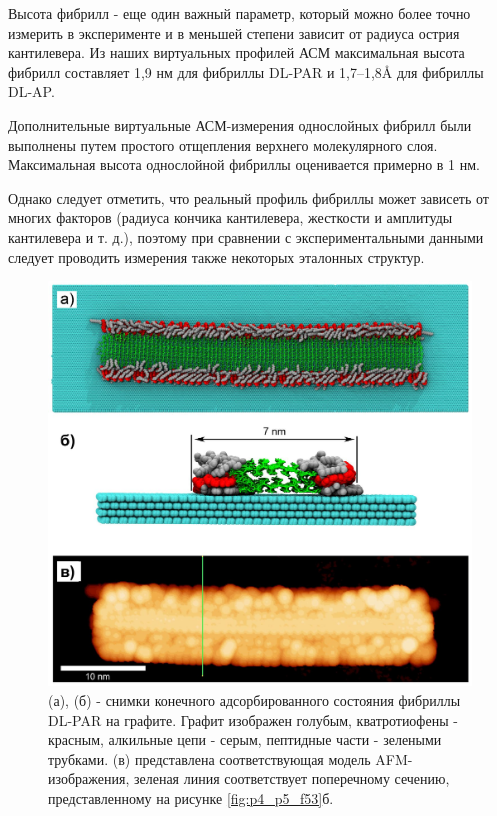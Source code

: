     Высота фибрилл - еще один важный параметр, который можно более точно измерить в эксперименте и в меньшей степени зависит от радиуса острия кантилевера. Из наших виртуальных профилей АСМ максимальная высота фибрилл составляет 1,9 нм для фибриллы DL-PAR и 1,7–1,8\AA{} для фибриллы DL-AP.

    Дополнительные виртуальные АСМ-измерения однослойных фибрилл были выполнены путем простого отщепления верхнего молекулярного слоя. Максимальная высота однослойной фибриллы оценивается примерно в 1 нм.

    Однако следует отметить, что реальный профиль фибриллы может зависеть от многих факторов (радиуса кончика кантилевера, жесткости и амплитуды кантилевера и т. д.), поэтому при сравнении с экспериментальными данными следует проводить измерения также некоторых эталонных структур.


\begin{figure} [H]
    \centering
    \includegraphics[width=\textwidth]{images/p4/punkt5/part4_p5_f52.pdf}
    \caption[Снимки конечного адсорбированного состояния фибриллы DL-PAR на графите]{(а), (б) - снимки конечного адсорбированного состояния фибриллы DL-PAR на графите. Графит изображен голубым, кватротиофены - красным, алкильные цепи - серым, пептидные части - зелеными трубками. (в) представлена соответствующая модель AFM-изображения, зеленая линия соответствует поперечному сечению, представленному на рисунке \ref{fig:p4_p5_f53}б.}
    \label{fig:p4_p5_f52}
\end{figure}


